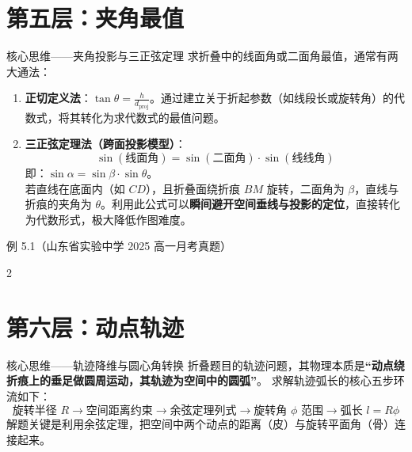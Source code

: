 \documentclass[11pt,a4paper]{ctexart}
\begin{document}
\newpage

\section{第五层：夹角最值}

\begin{keybox}{核心思维——夹角投影与三正弦定理}
求折叠中的线面角或二面角最值，通常有两大通法：
\begin{enumerate}[label=\arabic*., leftmargin=2em, itemsep=0.1em]
  \item \textbf{正切定义法}：$\tan\theta = \frac{h}{d_{\text{proj}}}$。通过建立关于折起参数（如线段长或旋转角）的代数式，将其转化为求代数式的最值问题。
  \item \textbf{三正弦定理法（跨面投影模型）}：
    \[ \sin(\text{线面角}) = \sin(\text{二面角}) \cdot \sin(\text{线线角}) \]
    即：$\sin\alpha = \sin\beta \cdot \sin\theta$。\\
    若直线在底面内（如 $CD$），且折叠面绕折痕 $BM$ 旋转，二面角为 $\beta$，直线与折痕的夹角为 $\theta$。利用此公式可以\textbf{瞬间避开空间垂线与投影的定位}，直接转化为代数形式，极大降低作图难度。
\end{enumerate}
\end{keybox}

\begin{exbox}{例 5.1（山东省实验中学 2025 高一月考真题）}
  \qSolidFoldingRectangleStem
  \par\addvspace{0.4em}{\centering
  \qSolidFoldingRectangleFigure[0.9]
  \par}\addvspace{0.4em}
\end{exbox}

\begin{paracol}{2}
\switchcolumn
{}
\end{paracol}

\newpage

\section{第六层：动点轨迹}

\begin{keybox}{核心思维——轨迹降维与圆心角转换}
折叠题目的轨迹问题，其物理本质是\textbf{“动点绕折痕上的垂足做圆周运动，其轨迹为空间中的圆弧”}。
求解轨迹弧长的核心五步环流如下：
\[
\boxed{\text{旋转半径 } R} 
\rightarrow 
\boxed{\text{空间距离约束}} 
\rightarrow 
\boxed{\text{余弦定理列式}} 
\rightarrow 
\boxed{\text{旋转角 } \phi \text{ 范围}} 
\rightarrow 
\boxed{\text{弧长 } l = R\phi}
\]
解题关键是利用余弦定理，把空间中两个动点的距离（皮）与旋转平面角（骨）连接起来。
\end{keybox}
\end{document}
